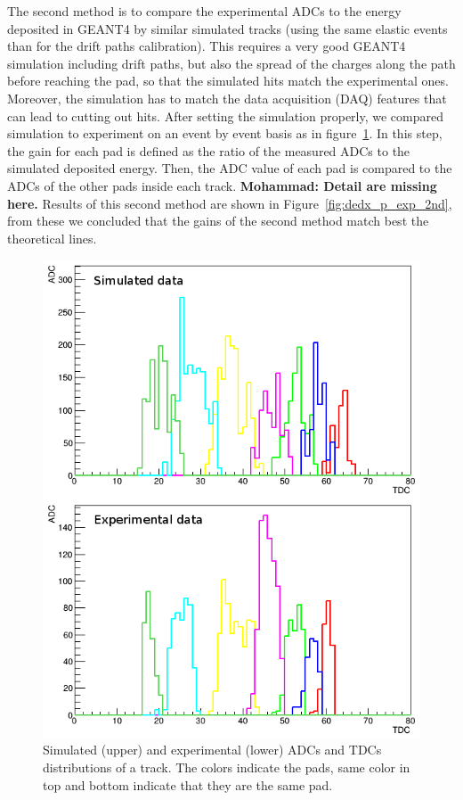 \documentclass[twocolumn,showpacs,superscriptaddress,groupedaddress]{revtex4}
\begin{document}
The second method is to compare the experimental ADCs to the energy deposited in 
GEANT4 by similar simulated tracks (using the same elastic events than for the drift 
paths calibration). This requires a very good GEANT4 simulation 
including drift paths, but also the spread of the charges along the path
before reaching the pad, so that the simulated hits match the experimental 
ones. Moreover, the simulation has to match the data acquisition (DAQ) features 
that can lead to cutting out hits. After setting the simulation properly, we 
compared simulation to experiment on an event by event basis as in 
figure~\ref{fig:EVENT_adc_tdc}. In this step, the gain for each pad is defined 
as the ratio of the measured ADCs to the simulated deposited energy.
Then, the ADC value of each pad is compared to 
the ADCs of the other pads inside each track.
{\bf \color{red} Mohammad: Detail are missing here.}
Results of this second method are shown in Figure~\ref{fig:dedx_p_exp_2nd},
from these we concluded that the gains of the 
second method match best the theoretical lines.

\begin{figure}[tb]
\includegraphics[scale=0.350]{fig/EVENT_adc_tdc.png}
\caption{Simulated (upper) and experimental (lower) ADCs and TDCs distributions 
of a track. The colors indicate the pads, same color in top and bottom indicate 
that they are the same pad.}
\label{fig:EVENT_adc_tdc}
\end{figure}
\end{document}
